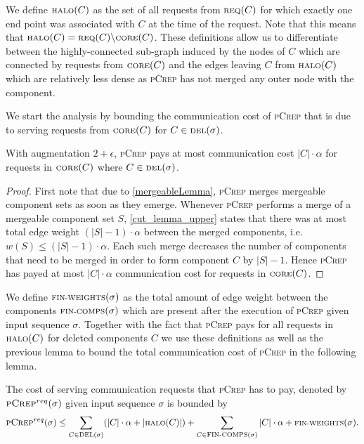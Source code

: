 \documentclass[a4paper,UKenglish,cleveref, autoref, thm-restate,authorcolumns]{lipics-v2019}
\newcommand{\adjDel}{\textsc{pCrep}}
\newcommand{\del}{\text{\scriptsize DEL}}
\newcommand{\core}{\text{\scriptsize CORE}}
\newcommand{\halo}{\text{\scriptsize HALO}}
\newcommand{\req}{\text{\scriptsize REQ}}
\newcommand{\finalComps}{\text{\scriptsize FIN-COMPS}}
\newcommand{\finalWeights}{\text{\scriptsize FIN-WEIGHTS}}
\begin{document}
We define $\halo(C)$ as the set of all requests from $\req(C)$ for which exactly one end point was associated with $C$ at the time of the request. Note that this means that $\halo(C)=\req(C)\backslash \core(C)$.
These definitions allow us to differentiate between the highly-connected sub-graph induced by the nodes of $C$ which are connected by requests from $\core(C)$ and the edges leaving $C$ from $\halo(C)$ which are relatively less dense as \adjDel{} has not merged any outer node with the component.

We start the analysis by bounding the communication cost of \adjDel{} that is due to serving requests from $\core(C)$ for $C\in\del{}(\sigma)$.

\begin{lemma}
	\label{core_comm_upper}
	With augmentation $2+\epsilon$, \adjDel{} pays at most communication cost $|C|\cdot\alpha$ for requests in $\core(C)$ where $C\in\del{}(\sigma)$.
\end{lemma}

\begin{proof}
	First note that due to \cref{mergeableLemma}, \adjDel{} merges mergeable component sets as soon as they emerge.
	Whenever \adjDel{} performs a merge of a mergeable component set $S$, \cref{cut_lemma_upper} states that there was at most total edge weight $(|S|-1)\cdot\alpha$ between the merged components, i.e. $w(S)\leq(|S|-1)\cdot\alpha$. Each such merge decreases the number of components that need to be merged in order to form component $C$ by $|S|-1$. Hence \adjDel{} has payed at most $|C|\cdot\alpha$ communication cost for requests in $\core(C)$.
\end{proof}

We define $\finalWeights{}(\sigma)$ as the total amount of edge weight between the components $\finalComps{}(\sigma)$ which are present after the execution of \adjDel{} given input sequence $\sigma$.
Together with the fact that \adjDel{} pays for all requests in $\halo(C)$ for deleted components $C$ we use these definitions as well as the previous lemma to bound the total communication cost of \adjDel{} in the following lemma.

\begin{lemma}
	\label{crep_req_bound}
	The cost of serving communication requests that \adjDel{} has to pay, denoted by $\adjDel{}^{req}(\sigma)$ given input sequence $\sigma$ is bounded by
	\begin{align*}
	\adjDel{}^{req}(\sigma)\leq\sum_{C\in\del{}(\sigma)}(|C|\cdot\alpha+|\halo(C)|)+\sum_{C\in \finalComps(\sigma)}|C|\cdot\alpha+\finalWeights(\sigma).
	\end{align*}
\end{lemma}
\end{document}
